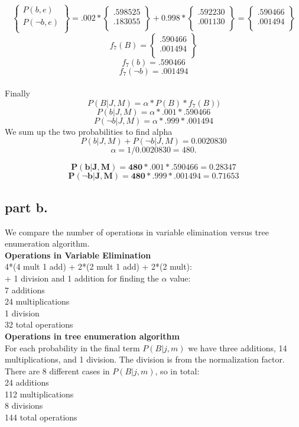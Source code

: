 \[
\begin{Bmatrix} P(b,e) \\ P(\neg b, e) \\ \end{Bmatrix} = 
.002 * \begin{Bmatrix} .598525 \\ .183055 \\\end{Bmatrix} + 0.998 * \begin{Bmatrix}.592230 \\ .001130 \\ \end{Bmatrix} = 
\begin{Bmatrix} .590466 \\ .001494 \\ \end{Bmatrix}
\]
\[
f_7(B) = \begin{Bmatrix} .590466 \\ .001494 \\ \end{Bmatrix}
\]
\[
f_7(b) = .590466
\]
\[
f_7(\neg b) = .001494
\]
\\
Finally
\[
P(B|J,M) = \alpha * P(B) * f_7(B) )
\]
\[
P(b|J,M) = \alpha * .001 * .590466
\]
\[
P(\neg b|J,M) = \alpha * .999 * .001494
\]
We sum up the two probabilities to find alpha
\[
{P(b|J,M) + P(\neg b | J,M) = 0.0020830}
\]
\[
\alpha = 1 / 0.0020830 = 480.
\]

\[
\bm{
P(b|J,M) = 480 * .001 * .590466 = 0.28347
}
\]
\[
\bm{
P(\neg b|J,M) = 480 * .999 * .001494 = 0.71653
}
\]


\subsection{part b.}
We compare the number of operations in variable elimination versus tree enumeration algorithm. \\

\textbf{Operations in Variable Elimination} \\
4*(4 mult 1 add) +  2*(2 mult 1 add) + 2*(2 mult): \\
+ 1 division and 1 addition for finding the $\alpha$ value: \\
7 additions \\
24 multiplications \\
1 division \\
32 total operations \\

\textbf{Operations in tree enumeration algorithm} \\
For each probability in the final term $P(B|j,m)$ we have three additions, 14 multiplications, and 1 division. The division is from the normalization factor.
There are 8 different cases in $P(B|j,m)$, so in total: \\
24 additions \\
112 multiplications \\
8 divisions \\
144 total operations \\

